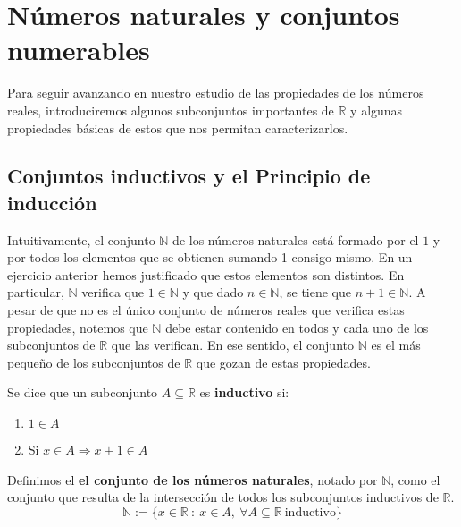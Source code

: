 \chapter{Números naturales y conjuntos numerables}
Para seguir avanzando en nuestro estudio de las propiedades de los números reales, introduciremos
algunos subconjuntos importantes de $\mathbb{R}$ y algunas propiedades básicas de estos que nos permitan
caracterizarlos.


\section{Conjuntos inductivos y el Principio de inducción}
Intuitivamente, el conjunto $\mathbb{N}$ de los números naturales está formado por el $1$ y por todos
los elementos que se obtienen sumando 1 consigo mismo. En un ejercicio anterior hemos justificado
que estos elementos son distintos. En particular, $\mathbb{N}$ verifica que $1 \in \mathbb{N}$ y que
dado $n \in \mathbb{N}$, se tiene que $n+1 \in \mathbb{N}$. A pesar de que no es el único conjunto de
números reales que verifica estas propiedades, notemos que $\mathbb{N}$ debe estar contenido en
todos y cada uno de los subconjuntos de $\mathbb{R}$ que las verifican. En ese sentido,
el conjunto $\mathbb{N}$ es el más pequeño de los subconjuntos de $\mathbb{R}$ que gozan de estas propiedades.

\begin{definicion}
    Se dice que un subconjunto $A \subseteq \mathbb{R}$ es \textbf{inductivo} si:
    \begin{enumerate}
        \item $1 \in A$
        \item Si $x \in A \Longrightarrow x+1 \in A$
    \end{enumerate}
\end{definicion}

\begin{definicion}
    Definimos el \textbf{el conjunto de los números naturales}, notado por $\mathbb{N}$, como el conjunto
    que resulta de la intersección de todos los subconjuntos inductivos de $\mathbb{R}$.
    \begin{equation*}
        \mathbb{N} := \{x \in \mathbb{R}~:~x \in A, ~\forall A \subseteq \mathbb{R} ~\text{inductivo}\}
    \end{equation*} 
\end{definicion}

